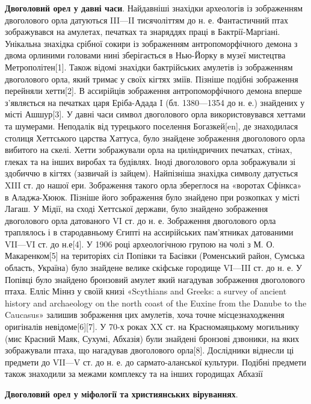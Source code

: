 \begin{multicols}{2}
\textbf{Двоголовий орел у давні часи}. Найдавніші знахідки археологів із
зображенням двоголового орла датуються III—II тисячоліттям до н. е.
Фантастичний птах зображувався на амулетах, печатках та знаряддях праці в
Бактрії-Маргіані. Унікальна знахідка срібної сокири із зображенням
антропоморфічного демона з двома орлиними головами нині зберігається в
Нью-Йорку в музеї мистецтва Метрополітен[1]. Також відомі знахідки бактрійських
амулетів із зображенням двоголового орла, який тримає у своїх кігтях зміїв.
Пізніше подібні зображення перейняли хетти[2]. В ассирійців зображення
антропоморфічного демона вперше з'являється на печатках царя Еріба-Адада I (бл.
1380—1354 до н. е.) знайдених у місті Ашшур[3]. У давні часи символ двоголового
орла використовувався хеттами та шумерами. Неподалік від турецького поселення
Богазкей[en], де знаходилася столиця Хеттського царства Хаттуса, було знайдене
зображення двоголового орла вибитого на скелі. Хетти зображували орла на
циліндричних печатках, стінах, глеках та на інших виробах та будівлях. Іноді
двоголового орла зображували зі здобиччю в кігтях (зазвичай із зайцем).
Найпізніша знахідка символу датується XIII ст. до нашої ери. Зображення такого
орла збереглося на «воротах Сфінкса» в Аладжа-Хююк. Пізніше його зображення
було знайдено при розкопках у місті Лагаш. У Мідії, на сході Хеттської держави,
було знайдено зображення двоголового орла датованого VI ст. до н. е. Зображення
двоголового орла траплялось і в стародавньому Єгипті на ассирійських
пам'ятниках датованими VII—VI ст. до н.е[4]. У 1906 році археологічною групою
на чолі з М. О. Макаренком[5] на територіях сіл Попівки та Басівки (Роменський
район, Сумська область, Україна) було знайдене велике скіфське городище VI—III
ст. до н. е. У Попівці було знайдено бронзовий амулет який нагадував зображення
двоголового птаха. Елліс Міннз у своїй книзі «Scythians and Greeks: a survey of
ancient history and archaeology on the north coast of the Euxine from the
Danube to the Caucasus» залишив зображення цих амулетів, хоча точне
місцезнаходження оригіналів невідоме[6][7]. У 70-х роках XX ст. на
Красномаяцькому могильнику (мис Красний Маяк, Сухумі, Абхазія) були знайдені
бронзові дзвоники, на яких зображували птаха, що нагадував двоголового орла[8].
Дослідники віднесли ці предмети до VII—V ст. до н. е. до сармато-аланської
культури. Подібні предмети також знаходили за межами комплексу та на інших
городищах Абхазії

\textbf{Двоголовий орел у міфології та християнських віруваннях}. 


\end{multicols}
